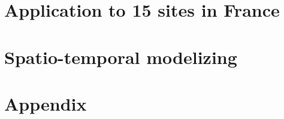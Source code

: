 \documentclass[a4paper,12pt]{memoir}
\begin{document}
\part{Application to 15 sites in France}%
\label{cha:application_to_15_sites_in_France}

\part{Spatio-temporal modelizing}%
\label{cha:spatio_temporal_modelizing}

\pagebreak
{}
\printbibliography
\pagebreak

\part*{Appendix}%
\label{cha:appendix}


\appendix
\setcounter{table}{0}
\setcounter{figure}{0}
\setcounter{equation}{0}
\renewcommand{\thetable}{\thesection-\arabic{table}}
\renewcommand{\thefigure}{\thesection-\arabic{figure}}
\renewcommand{\theequation}{\thesection-\arabic{equation}}
\end{document}
